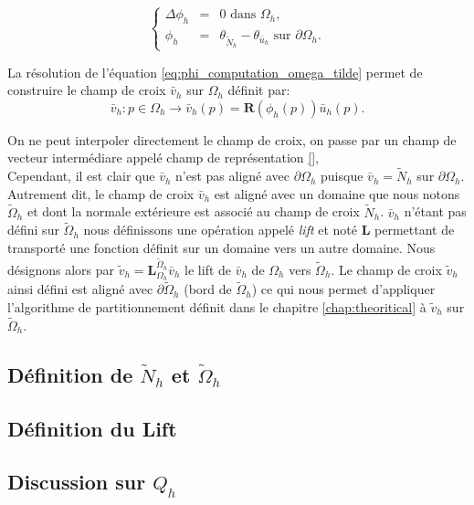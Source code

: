 \begin{equation}
\left\{
\begin{array}{lcl}
\Delta\phi_h &=& 0 \mbox{ dans }\Omega_h,\\[0.25cm]
\phi_h &=& \theta_{\widetilde{N}_h}-\theta_{\bar{u}_h} \mbox{ sur } \partial\Omega_h.
\end{array}
\right.
\label{eq:phi_computation_omega_tilde}
\end{equation}

La résolution de l'équation \eqref{eq:phi_computation_omega_tilde} permet de construire le champ de croix $\bar{v}_h$ sur $\Omega_h$ définit par:
$$\bar{v}_h:p\in\Omega_h\longrightarrow \bar{v}_h(p)=\mathbf{R}(\phi_h(p))\bar{u}_h(p).$$

\newpage

On ne peut interpoler directement le champ de croix, on passe par un champ de vecteur intermédiare appelé champ de représentation \ref{},\\
\[\]
Cependant, il est clair que $\bar{v}_h$ n'est pas aligné avec $\partial\Omega_h$ puisque $\bar{v}_h=\widetilde{N}_h$ sur $\partial\Omega_h$. Autrement dit, le champ de croix $\bar{v}_h$ est aligné avec un domaine que nous notons $\widetilde{\Omega}_h$ et dont la normale extérieure est associé au champ de croix $\widetilde{N}_h$. $\bar{v}_h$ n'étant pas défini sur $\widetilde{\Omega}_h$ nous définissons une opération appelé \emph{lift} et noté $\mathbf{L}$ permettant de transporté une fonction définit sur un domaine vers un autre domaine. Nous désignons alors par $\widetilde{v}_h=\mathbf{L}_{\Omega_h}^{\widetilde{\Omega}_h}\bar{v}_h$ le lift de $\bar{v}_h$ de $\Omega_h$ vers $\widetilde{\Omega}_h$. Le champ de croix $\widetilde{v}_h$ ainsi défini est aligné avec $\partial\widetilde{\Omega}_h$ (bord de $\widetilde{\Omega}_h$) ce qui nous permet d'appliquer l'algorithme de partitionnement définit dans le chapitre \ref{chap:theoritical} à $\widetilde{v}_h$ sur $\widetilde{\Omega}_h$.

\subsection*{Définition de $\widetilde{N}_h$ et $\widetilde{\Omega}_h$}

\subsection*{Définition du Lift}

\subsection*{Discussion sur $Q_h$}

